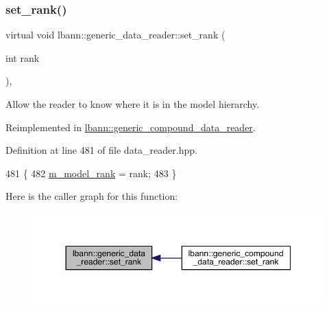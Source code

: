 \subsubsection{\texorpdfstring{set\+\_\+rank()}{set\_rank()}}
{\footnotesize\ttfamily virtual void lbann\+::generic\+\_\+data\+\_\+reader\+::set\+\_\+rank (\begin{DoxyParamCaption}\item[{int}]{rank }\end{DoxyParamCaption})\hspace{0.3cm}{\ttfamily [inline]}, {\ttfamily [virtual]}}



Allow the reader to know where it is in the model hierarchy. 



Reimplemented in \hyperlink{classlbann_1_1generic__compound__data__reader_a85860f9ae7e38ae98421219e41b5f829}{lbann\+::generic\+\_\+compound\+\_\+data\+\_\+reader}.



Definition at line 481 of file data\+\_\+reader.\+hpp.


\begin{DoxyCode}
481                                   \{
482     \hyperlink{classlbann_1_1generic__data__reader_a5e89d5e6797f7e7b69d1a64f7d8b5d6b}{m\_model\_rank} = rank;
483   \}
\end{DoxyCode}
Here is the caller graph for this function\+:\nopagebreak
\begin{figure}[H]
\begin{center}
\leavevmode
\includegraphics[width=350pt]{classlbann_1_1generic__data__reader_a8515fb4ffbeaa89fd8459b66b9ba358f_icgraph}
\end{center}
\end{figure}
\mbox{\label{classlbann_1_1generic__data__reader_a8ac14fee514ad30efe8571ce68c2a95d}} 
